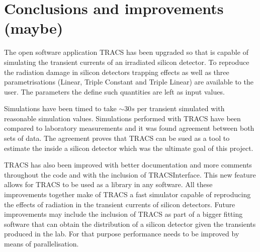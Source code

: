 \chapter{Conclusions and improvements (maybe)}

The open software application TRACS has been upgraded so that is capable of simulating the transient currents of an irradiated silicon detector. To reproduce the radiation damage in silicon detectors trapping effects as well as three \neff parametrisations (Linear, Triple Constant and Triple Linear) are available to the user. The parameters the define such quantities are left as input values.

Simulations have been timed to take $\sim 30s$ per transient simulated with reasonable simulation values. Simulations performed with TRACS have been compared to laboratory measurements and it was found agreement between both sets of data. The agreement proves that TRACS can be sued as a tool to estimate the \neff inside a silicon detector which was the ultimate goal of this project.

TRACS has also been improved with better documentation and more comments throughout the code and with the inclusion of TRACSInterface. This new feature allows for TRACS to be used as a library in any software.  All these improvements together make of TRACS a fast simulator capable of reproducing the effects of radiation in the transient currents of silicon detectors. Future improvements may include the inclusion of TRACS as part of a bigger fitting software that can obtain the \neff distribution of a silicon detector given the transients produced in the lab. For that purpose performance needs to be improved by means of parallelisation.


